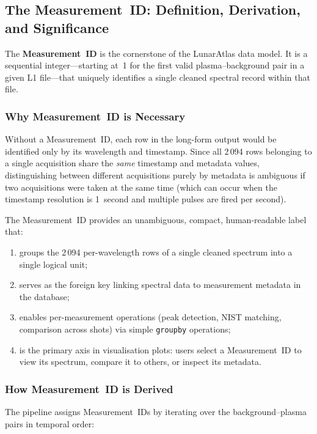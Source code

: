 \documentclass[a4paper,twocolumn,10pt]{article}
\begin{document}
\subsection{The Measurement~ID: Definition, Derivation, and Significance}
\label{subsec:measurement_id}

The \textbf{Measurement~ID} is the cornerstone of the LunarAtlas data
model.  It is a sequential integer---starting at~1 for the first valid
plasma--background pair in a given L1 file---that uniquely identifies
a single cleaned spectral record within that file.

\subsubsection{Why Measurement~ID is Necessary}

Without a Measurement~ID, each row in the long-form output would be
identified only by its wavelength and timestamp.  Since all 2\,094
rows belonging to a single acquisition share the \emph{same}
timestamp and metadata values, distinguishing between different
acquisitions purely by metadata is ambiguous if two acquisitions were
taken at the same time (which can occur when the timestamp resolution
is 1~second and multiple pulses are fired per second).

The Measurement~ID provides an unambiguous, compact, human-readable
label that:
\begin{enumerate}[nosep,leftmargin=*]
  \item groups the 2\,094 per-wavelength rows of a single cleaned
    spectrum into a single logical unit;
  \item serves as the foreign key linking spectral data to measurement
    metadata in the database;
  \item enables per-measurement operations (peak detection, NIST
    matching, comparison across shots) via simple \texttt{groupby}
    operations;
  \item is the primary axis in visualisation plots: users select a
    Measurement~ID to view its spectrum, compare it to others, or
    inspect its metadata.
\end{enumerate}

\subsubsection{How Measurement~ID is Derived}

The pipeline assigns Measurement~IDs by iterating over the
background--plasma pairs in temporal order:
\end{document}

